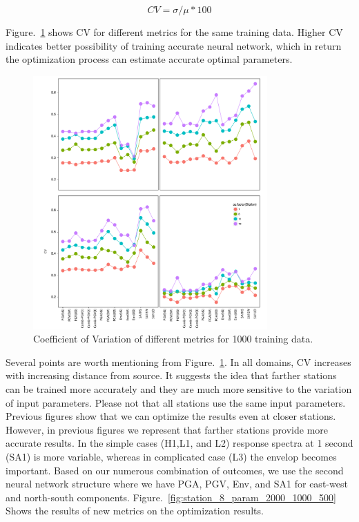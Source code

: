 \begin{equation}
CV=\sigma/\mu * 100 
\end{equation}

Figure.~\ref{fig:metrics_sensitivity} shows CV for different metrics for the same training data. Higher CV indicates better possibility of training accurate neural network, which in return the optimization process can estimate accurate optimal parameters. 

  \begin{figure}[ht]
    \centering
    \includegraphics[width=0.8\textwidth]{figures/pdf/metrics_sensitivity.pdf}
    \caption{Coefficient of Variation of different metrics for 1000 training data.  }
    \label{fig:metrics_sensitivity}
\end{figure}

Several points are worth mentioning from Figure.~\ref{fig:metrics_sensitivity}. In all domains, CV increases with increasing distance from source. It suggests the idea that farther stations can be trained more accurately and they are much more sensitive to the variation of input parameters. Please not that all stations use the same input parameters. Previous figures show that we can optimize the results even at closer stations. However, in previous figures we represent that farther stations provide more accurate results. In the simple cases (H1,L1, and L2) response spectra at 1 second (SA1) is more variable, whereas in complicated case (L3) the envelop becomes important. Based on our numerous combination of outcomes, we use the second neural network structure where we have PGA, PGV, Env, and SA1 for east-west and north-south components. Figure.~\ref{fig:station_8_param_2000_1000_500} Shows the results of new metrics on the optimization results. 

